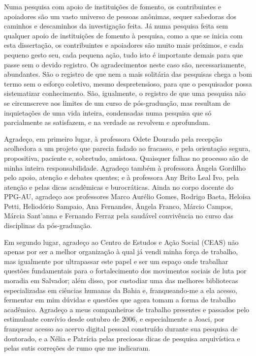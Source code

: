 \begin{agradecimentos}
Numa pesquisa com apoio de instituições de fomento, os contribuintes e apoiadores são um vasto universo de pessoas anônimas, sequer sabedoras dos caminhos e descaminhos da investigação feita. Já numa pesquisa feita sem qualquer apoio de instituições de fomento à pesquisa, como a que se inicia com esta dissertação, os contribuintes e apoiadores são muito mais próximos, e cada pequeno gesto seu, cada pequena ação, tudo isto é importante demais para que passe sem o devido registro. Os agradecimentos neste caso são, necessariamente, abundantes. São o registro de que nem a mais solitária das pesquisas chega a bom termo sem o esforço coletivo, mesmo despretensioso, para que o pesquisador possa sistematizar conhecimento. São, igualmente, o registro de que uma pesquisa não se circunscreve aos limites de um curso de pós-graduação, mas resultam de inquietações de uma vida inteira, condensadas numa pesquisa que só parcialmente as satisfazem, e na verdade as revolvem e aprofundam.

Agradeço, em primeiro lugar, à professora Odete Dourado pela recepção acolhedora a um projeto que parecia fadado ao fracasso, e pela orientação segura, propositiva, paciente e, sobretudo, amistosa. Quaisquer falhas no processo são de minha inteira responsabilidade. Agradeço também à professora Ângela Gordilho pelo apoio, atenção e debates quentes; e à professora Any Brito Leal Ivo, pela atenção e pelas dicas acadêmicas e burocráticas. Ainda no corpo docente do PPG-AU, agradeço aos professores Marco Aurélio Gomes, Rodrigo Baeta, Heloísa Petti, Heliodório Sampaio, Ana Fernandes, Ângela Franco, Márcio Campos, Márcia Sant'anna e Fernando Ferraz pela saudável convivência no curso das disciplinas da pós-graduação.

Em segundo lugar, agradeço ao Centro de Estudos e Ação Social (CEAS) não apenas por ser a melhor organização à qual já vendi minha força de trabalho, mas igualmente por ultrapassar este papel e ser um espaço onde trabalhar questões fundamentais para o fortalecimento dos movimentos sociais de luta por moradia em Salvador; além disso, por custodiar uma das melhores bibliotecas especializadas em ciências humanas da Bahia e, franqueando-me a ela acesso, fermentar em mim dúvidas e questões que agora tomam a forma de trabalho acadêmico. Agradeço a meus companheiros de trabalho presentes e passados pelo estimulante convívio desde outubro de 2006, e especialmente a Joaci, por franquear acesso ao acervo digital pessoal construído durante sua pesquisa de doutorado, e a Nélia e Patrícia pelas preciosas dicas de pesquisa arquivística e pelas sutis correções de rumo que me indicaram.


\end{agradecimentos}
